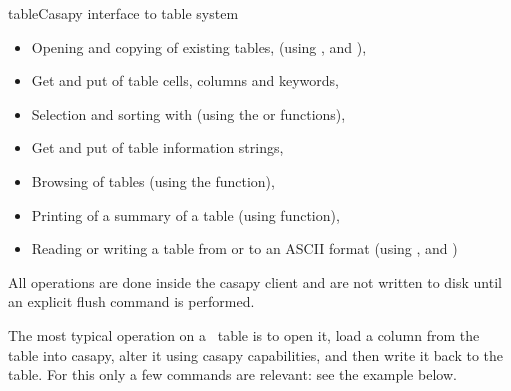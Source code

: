 \begin{ahmodule}{table}{Casapy interface to table system}
\begin{ahdescription}
\begin{itemize}
\item Opening and copying of existing tables, (using
, and
),
\item Get and put of table cells, columns and keywords,
\item Selection and sorting with 
  (using the
  or
  functions),
\item Get and put of table information strings,
\item Browsing of tables (using the  function),
\item Printing of a summary of a table (using 
function),
\item Reading or writing a table from or to an ASCII format (using
, and 
)
\end{itemize}



All operations are done inside the casapy client and are not written
to disk until an explicit flush command is performed. 

The most typical operation on a \casa\ table is to open it,
load a column from the table
into casapy, alter it using casapy capabilities, and then write it
back to the table. For this only a few commands are relevant: see the
example below.


\end{ahdescription}
\end{ahmodule}
